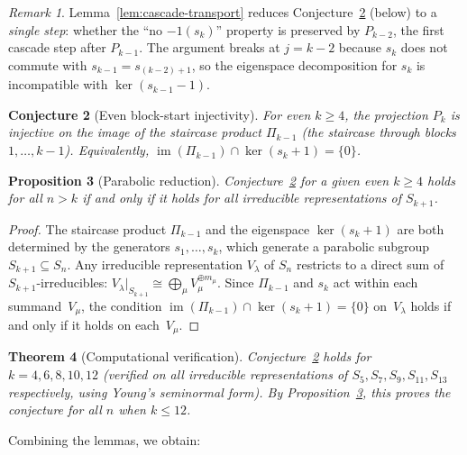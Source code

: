 \documentclass[12pt]{article}
\newtheorem{theorem}{Theorem}
\newtheorem{proposition}[theorem]{Proposition}
\newtheorem{conjecture}[theorem]{Conjecture}
\theoremstyle{definition}
\theoremstyle{remark}
\newtheorem{remark}[theorem]{Remark}
\begin{document}
\begin{remark}
Lemma~\ref{lem:cascade-transport} reduces Conjecture~\ref{conj:even-block}
(below) to a \emph{single step}: whether the ``no $-1(s_k)$'' property is preserved
by $P_{k-2}$, the first cascade step after $P_{k-1}$.  The argument breaks at
$j = k - 2$ because $s_k$ does not commute with $s_{k-1} = s_{(k-2)+1}$, so the
eigenspace decomposition for $s_k$ is incompatible with $\ker(s_{k-1} - 1)$.
\end{remark}

\begin{conjecture}[Even block-start injectivity]
\label{conj:even-block}
For even $k \ge 4$, the projection $P_k$ is injective on the image of the
staircase product $\Pi_{k-1}$ (the staircase through blocks $1, \ldots, k{-}1$).
Equivalently, $\operatorname{im}(\Pi_{k-1}) \cap \ker(s_k + 1) = \{0\}$.
\end{conjecture}

\begin{proposition}[Parabolic reduction]
\label{prop:parabolic}
Conjecture~\ref{conj:even-block} for a given even $k \ge 4$ holds for
\emph{all} $n > k$ if and only if it holds for all irreducible representations
of $S_{k+1}$.
\end{proposition}

\begin{proof}
The staircase product $\Pi_{k-1}$ and the eigenspace $\ker(s_k + 1)$ are both
determined by the generators $s_1, \ldots, s_k$, which generate a parabolic
subgroup $S_{k+1} \subseteq S_n$.  Any irreducible representation $V_\lambda$
of $S_n$ restricts to a direct sum of $S_{k+1}$-irreducibles:
$V_\lambda \big|_{S_{k+1}} \cong \bigoplus_\mu V_\mu^{\oplus m_\mu}$.
Since $\Pi_{k-1}$ and $s_k$ act within each summand~$V_\mu$, the condition
$\operatorname{im}(\Pi_{k-1}) \cap \ker(s_k + 1) = \{0\}$ on~$V_\lambda$
holds if and only if it holds on each~$V_\mu$.
\end{proof}

\begin{theorem}[Computational verification]
\label{thm:verification}
Conjecture~\ref{conj:even-block} holds for $k = 4, 6, 8, 10, 12$ (verified on
all irreducible representations of $S_5, S_7, S_9, S_{11}, S_{13}$ respectively,
using Young's seminormal form).  By Proposition~\ref{prop:parabolic}, this
proves the conjecture for all $n$ when $k \le 12$.
\end{theorem}

Combining the lemmas, we obtain:
\end{document}
